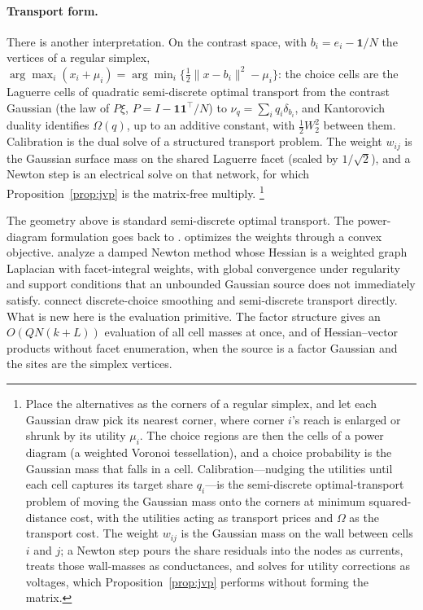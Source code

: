 \documentclass[12pt]{article}
\theoremstyle{remark}
\begin{document}
\paragraph{Transport form.}

There is another interpretation. On the contrast space, with $b_i = e_i - \mathbf{1}/N$ the vertices of
a regular simplex, $\arg\max_i (x_i + \mu_i) = \arg\min_i
\{\tfrac12 \|x - b_i\|^2 - \mu_i\}$: the choice cells are the
Laguerre cells of quadratic semi-discrete optimal transport from the
contrast Gaussian (the law of $P\xi$, $P = I - \mathbf{1}\mathbf{1}^\top/N$) to $\nu_q = \sum_i q_i \delta_{b_i}$, and
Kantorovich duality identifies $\Omega(q)$, up to an additive constant,
with $\tfrac12 W_2^2$ between them. Calibration is the dual solve of a
structured transport problem. The weight $w_{ij}$ is the Gaussian surface
mass on the shared Laguerre facet (scaled by $1/\sqrt2$), and a Newton step is
an electrical solve on that network, for which
Proposition~\ref{prop:jvp} is the matrix-free multiply.%
\footnote{Place the alternatives as the corners of a
regular simplex, and let each Gaussian draw pick its nearest corner,
where corner $i$'s reach is enlarged or shrunk by its utility $\mu_i$.
The choice regions are then the cells of a power diagram (a weighted
Voronoi tessellation), and a choice probability is the Gaussian mass
that falls in a cell. Calibration---nudging the utilities until each
cell captures its target share $q_i$---is the semi-discrete
optimal-transport problem of moving the Gaussian mass onto the corners
at minimum squared-distance cost, with the utilities acting as transport
prices and $\Omega$ as the transport cost. The weight $w_{ij}$ is the
Gaussian mass on the wall between cells $i$ and $j$; a Newton step pours
the share residuals into the nodes as currents, treats those
wall-masses as conductances, and solves for utility corrections as
voltages, which Proposition~\ref{prop:jvp} performs without forming the
matrix.}

The geometry above is standard semi-discrete optimal transport. The
power-diagram formulation goes back to \citet{aurenhammer1998}.
\citet{levy2015} optimizes the weights through a convex objective.
\citet{kmt2019} analyze a damped Newton method whose Hessian is a
weighted graph Laplacian with facet-integral weights, with global
convergence under regularity and support conditions that an unbounded
Gaussian source does not immediately satisfy. \citet{taskesen2023}
connect discrete-choice smoothing and semi-discrete transport directly.
What is new here is the evaluation primitive. The factor structure gives an
$O(QN(k+L))$ evaluation of all cell masses at once, and of
Hessian--vector products without facet enumeration, when the source is
a factor Gaussian and the sites are the simplex vertices.
\end{document}

